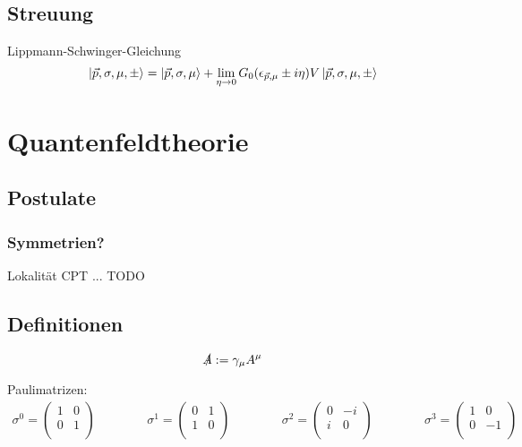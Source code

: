 \documentclass[11pt]{article}
\numberwithin{equation}{section}
\begin{document}
    \subsection{Streuung}
      Lippmann-Schwinger-Gleichung
      \begin{equation}
        \Ket{\vec{p},\sigma,\mu,\pm} = \Ket{\vec{p}, \sigma, \mu} + \lim_{\eta\rightarrow 0} G_0(\epsilon_{\vec{p},\mu}\pm i\eta) V \Ket{\vec{p},\sigma,\mu,\pm}
      \end{equation}


  \newpage
	\section{Quantenfeldtheorie} %
    \subsection{Postulate}
      \subsubsection{Symmetrien?}
        Lokalität
        CPT
        ...
        TODO
    \subsection{Definitionen}
      \begin{equation}
        \slashed{A} := \gamma_\mu A^\mu
      \end{equation}

      Paulimatrizen:
      \begin{equation}
        \begin{aligned}
          \sigma^0 = \left(\begin{matrix}
            1 & 0 \\
            0 & 1 \\
          \end{matrix}\right) &&\hspace{30pt}
          \sigma^1 = \left(\begin{matrix}
            0 & 1 \\
            1 & 0 \\
          \end{matrix}\right) &&\hspace{30pt}
          \sigma^2 = \left(\begin{matrix}
            0 & -i \\
              i & 0 \\
          \end{matrix}\right) &&\hspace{30pt}
          \sigma^3 = \left(\begin{matrix}
            1 & 0 \\
            0 & -1 \\
          \end{matrix}\right)
        \end{aligned}
      \end{equation}
\end{document}
